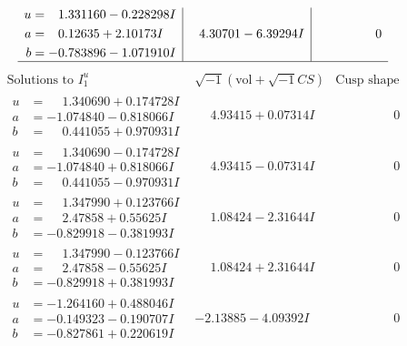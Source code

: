 \documentclass[1p]{elsarticle_modified}
\theoremstyle{definition}
\newcommand{\I}{\sqrt{-1}}
\begin{document}
$$\begin{array}{c|c|c}
\begin{aligned}
u &= \phantom{-}1.331160 - 0.228298 I \\
a &= \phantom{-}0.12635 + 2.10173 I \\
b &= -0.783896 - 1.071910 I\end{aligned}
 & \phantom{-}4.30701 - 6.39294 I & \phantom{-0.000000 } 0\\
 \hline 
 \end{array}$$\newpage$$\begin{array}{c|c|c}  
\text{Solutions to }I^u_{1}& \I (\text{vol} + \sqrt{-1}CS) & \text{Cusp shape}\\
 \hline 
\begin{aligned}
u &= \phantom{-}1.340690 + 0.174728 I \\
a &= -1.074840 - 0.818066 I \\
b &= \phantom{-}0.441055 + 0.970931 I\end{aligned}
 & \phantom{-}4.93415 + 0.07314 I & \phantom{-0.000000 } 0 \\ \hline\begin{aligned}
u &= \phantom{-}1.340690 - 0.174728 I \\
a &= -1.074840 + 0.818066 I \\
b &= \phantom{-}0.441055 - 0.970931 I\end{aligned}
 & \phantom{-}4.93415 - 0.07314 I & \phantom{-0.000000 } 0 \\ \hline\begin{aligned}
u &= \phantom{-}1.347990 + 0.123766 I \\
a &= \phantom{-}2.47858 + 0.55625 I \\
b &= -0.829918 - 0.381993 I\end{aligned}
 & \phantom{-}1.08424 - 2.31644 I & \phantom{-0.000000 } 0 \\ \hline\begin{aligned}
u &= \phantom{-}1.347990 - 0.123766 I \\
a &= \phantom{-}2.47858 - 0.55625 I \\
b &= -0.829918 + 0.381993 I\end{aligned}
 & \phantom{-}1.08424 + 2.31644 I & \phantom{-0.000000 } 0 \\ \hline\begin{aligned}
u &= -1.264160 + 0.488046 I \\
a &= -0.149323 - 0.190707 I \\
b &= -0.827861 + 0.220619 I\end{aligned}
 & -2.13885 - 4.09392 I & \phantom{-0.000000 } 0 \\ \hline\begin{aligned}

\end{aligned}
\end{array}$$
\end{document}
